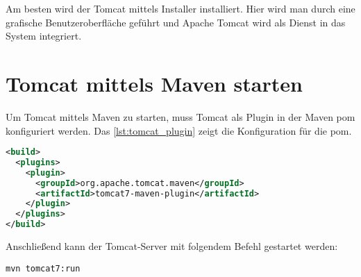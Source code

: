 Am besten wird der Tomcat mittels Installer installiert. Hier wird man durch eine grafische Benutzeroberfläche geführt und Apache Tomcat wird als Dienst in das System integriert. 

\section{Tomcat mittels Maven starten}

Um Tomcat mittels Maven zu starten, muss Tomcat als Plugin in der Maven \gls{pom} konfiguriert werden. Das \autoref{lst:tomcat_plugin} zeigt die Konfiguration für die \gls{pom}.

 \begin{lstlisting}[caption=Tomcat 7 Maven Plugin, language=XML, label=lst:tomcat_plugin]
<build>
  <plugins>
    <plugin>
      <groupId>org.apache.tomcat.maven</groupId>
      <artifactId>tomcat7-maven-plugin</artifactId>
    </plugin>
  </plugins>
</build>
 \end{lstlisting}  
 
Anschließend kann der Tomcat-Server mit folgendem Befehl gestartet werden:
 
\lstinline[basicstyle=\ttfamily\small\mdseries]{mvn tomcat7:run}
 

 

